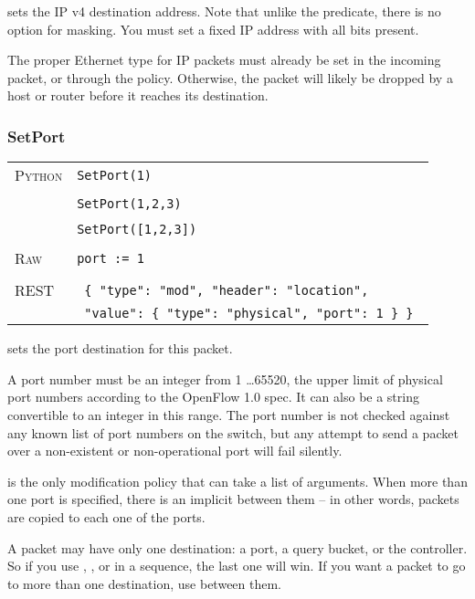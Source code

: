  sets the IP v4 destination address.  Note that unlike the  predicate,
there is no option for masking.  You must set a fixed IP address with all bits present.    

The proper Ethernet type for IP packets must already be set in the incoming packet, or through the 
 policy.  Otherwise, the packet will likely be dropped by a host or router before it 
reaches its destination.

\subsubsection{SetPort}

\bigskip
\begin{tabularx}{\linewidth}{lX}
\textsc{Python}   & \texttt{SetPort(1)} \\ \\
   & \texttt{SetPort(1,2,3)} \\ \\
   & \texttt{SetPort([1,2,3])} \\ \\
\textsc{Raw}    & \texttt{port := 1}     \\ \\
\textsc{REST} & \texttt{ \{ "type": "mod", "header": "location", } \\
 & \texttt{ "value": \{ "type": "physical", "port": 1 \} \} } 
\end{tabularx}

 sets the port destination for this packet.      

A port number must be an integer from
1 \ldots 65520, the upper limit of physical port numbers according to the OpenFlow 1.0 spec.  It can also be 
a string convertible to an integer in this range.  The port number is not checked against any known list
of port numbers on the switch, but any attempt to send a packet over a non-existent or non-operational
port will fail silently.

 is the only modification policy that can take a list of arguments.  When more than one
port is specified, there is an implicit  between them -- in other words, packets are copied
to each one of the ports.  

A packet may have only one destination: a port, a query bucket, or the controller.  So if you use 
, , or  in a sequence, the last one will
win.  If you want a packet to go to more than one destination, use  between them.    

